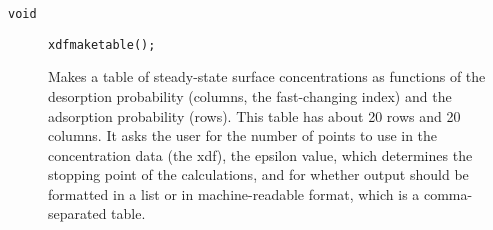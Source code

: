\documentclass[11pt]{article}
\newcommand {\ttt} {\texttt}
\begin{document}
\begin{description}
\item[\ttt{void}] 
\ttt{xdfmaketable();}

Makes a table of steady-state surface concentrations as functions of the desorption probability (columns, the fast-changing index) and the adsorption probability (rows). This table has about 20 rows and 20 columns. It asks the user for the number of points to use in the concentration data (the xdf), the epsilon value, which determines the stopping point of the calculations, and for whether output should be formatted in a list or in machine-readable format, which is a comma-separated table.


\end{description}



\end{document}
